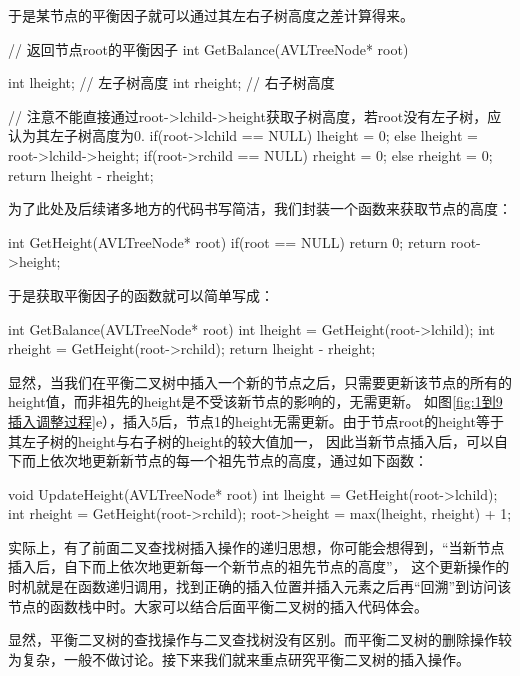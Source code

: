 于是某节点的平衡因子就可以通过其左右子树高度之差计算得来。
\begin{cppcode}
// 返回节点root的平衡因子
    int GetBalance(AVLTreeNode* root) {
        int lheight;    // 左子树高度
        int rheight;    // 右子树高度

        // 注意不能直接通过root->lchild->height获取子树高度，若root没有左子树，应认为其左子树高度为0.
        if(root->lchild == NULL) {
            lheight = 0;
        }
        else {
            lheight = root->lchild->height;
        }
        if(root->rchild == NULL) {
            rheight = 0;
        }
        else {
            rheight = 0;
        }
        return lheight - rheight;
    }
\end{cppcode}
为了此处及后续诸多地方的代码书写简洁，我们封装一个函数来获取节点的高度：
\begin{cppcode}
    int GetHeight(AVLTreeNode* root) {
        if(root == NULL) return 0;
        return root->height;
    }
\end{cppcode}
于是获取平衡因子的函数就可以简单写成：
\begin{cppcode}
    int GetBalance(AVLTreeNode* root) {
        int lheight = GetHeight(root->lchild);
        int rheight = GetHeight(root->rchild);
        return lheight - rheight;
    }
\end{cppcode}

显然，当我们在平衡二叉树中插入一个新的节点之后，只需要更新该节点的所有的height值，而非祖先的height是不受该新节点的影响的，无需更新。
如图\ref{fig:1到9插入调整过程}e），插入5后，节点1的height无需更新。由于节点root的height等于其左子树的height与右子树的height的较大值加一，
因此当新节点插入后，可以自下而上依次地更新新节点的每一个祖先节点的高度，通过如下函数：
\begin{cppcode}
    void UpdateHeight(AVLTreeNode* root) {
        int lheight = GetHeight(root->lchild);
        int rheight = GetHeight(root->rchild);
        root->height = max(lheight, rheight) + 1;
    }
\end{cppcode}

\begin{insightbox}
    实际上，有了前面二叉查找树插入操作的递归思想，你可能会想得到，“当新节点插入后，自下而上依次地更新每一个新节点的祖先节点的高度”，
    这个更新操作的时机就是在函数递归调用，找到正确的插入位置并插入元素之后再“回溯”到访问该节点的函数栈中时。大家可以结合后面平衡二叉树的插入代码体会。
\end{insightbox}


显然，平衡二叉树的查找操作与二叉查找树没有区别。而平衡二叉树的删除操作较为复杂，一般不做讨论。接下来我们就来重点研究平衡二叉树的插入操作。

